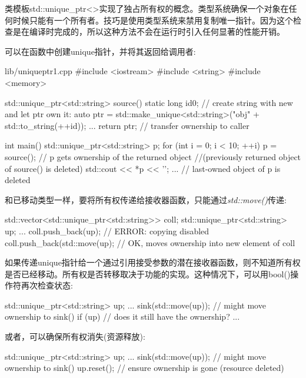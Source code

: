 类模板std::unique\_ptr<>实现了独占所有权的概念。类型系统确保一个对象在任何时候只能有一个所有者。技巧是使用类型系统来禁用复制唯一指针。因为这个检查是在编译时完成的，所以这种方法不会在运行时引入任何显著的性能开销。\par

可以在函数中创建unique指针，并将其返回给调用者:\par

\begin{codeboxt}[cpp]{lib/uniqueptr1.cpp}
#include <iostream>
#include <string>
#include <memory>

std::unique_ptr<std::string> source()
{
  static long id{0};
  // create string with new and let ptr own it:
  auto ptr = std::make_unique<std::string>("obj" + std::to_string(++id));
  ...
  return ptr; // transfer ownership to caller
}

int main()
{
  std::unique_ptr<std::string> p;
  for (int i = 0; i < 10; ++i) {
    p = source(); // p gets ownership of the returned object
                  //(previously returned object of source() is deleted)
    std::cout << *p << '\n';
    ...
  }
} // last-owned object of p is deleted
\end{codeboxt}

和已移动类型一样，要将所有权传递给接收器函数，只能通过\textit{std::move()}传递:\par

\begin{codebox}[cpp]
std::vector<std::unique_ptr<std::string>> coll;
std::unique_ptr<std::string> up;
...
coll.push_back(up); // ERROR: copying disabled
coll.push_back(std::move(up); // OK, moves ownership into new element of coll
\end{codebox}

如果传递unique指针给一个通过引用接受参数的潜在接收器函数，则不知道所有权是否已经移动。所有权是否转移取决于功能的实现。这种情况下，可以用bool()操作符再次检查状态:\par

\begin{codebox}[cpp]
std::unique_ptr<std::string> up;
...
sink(std::move(up)); // might move ownership to sink()
if (up) { // does it still have the ownership?
  ...
}
\end{codebox}

或者，可以确保所有权消失(资源释放):\par

\begin{codebox}[cpp]
std::unique_ptr<std::string> up;
...
sink(std::move(up)); // might move ownership to sink()
up.reset(); // ensure ownership is gone (resource deleted)
\end{codebox}


